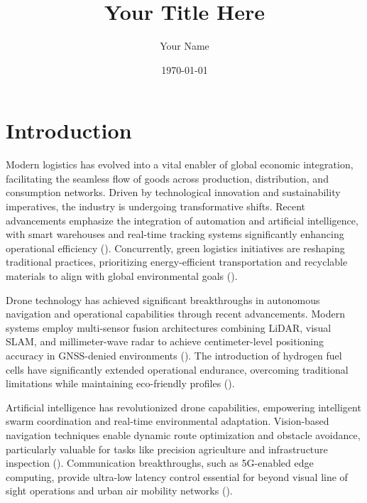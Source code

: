 \documentclass{article}
\title{Your Title Here}
\author{Your Name}
\date{\today}
\begin{document}
\maketitle

\section{Introduction}

  Modern logistics has evolved into a vital enabler of global economic integration, facilitating the seamless flow of goods across production, distribution, and consumption networks. Driven by technological innovation and sustainability imperatives, the industry is undergoing transformative shifts. Recent advancements emphasize the integration of automation and artificial intelligence, with smart warehouses and real-time tracking systems significantly enhancing operational efficiency (\cite{WOS001352081800001}). Concurrently, green logistics initiatives are reshaping traditional practices, prioritizing energy-efficient transportation and recyclable materials to align with global environmental goals (\cite{WOS:000693009900004}).

Drone technology has achieved significant breakthroughs in autonomous navigation and operational capabilities through recent advancements. Modern systems employ multi-sensor fusion architectures combining LiDAR, visual SLAM, and millimeter-wave radar to achieve centimeter-level positioning accuracy in GNSS-denied environments  (\cite{WOS:001140699200001}). The introduction of hydrogen fuel cells have significantly extended operational endurance, overcoming traditional limitations while maintaining eco-friendly profiles  (\cite{WOS:001139514900001}).

Artificial intelligence has revolutionized drone capabilities, empowering intelligent swarm coordination and real-time environmental adaptation. Vision-based navigation techniques enable dynamic route optimization and obstacle avoidance, particularly valuable for tasks like precision agriculture and infrastructure inspection  (\cite{WOS:000939165400001}). Communication breakthroughs, such as 5G-enabled edge computing, provide ultra-low latency control essential for beyond visual line of sight operations and urban air mobility networks  (\cite{WOS:001055864000001}).
\end{document}
